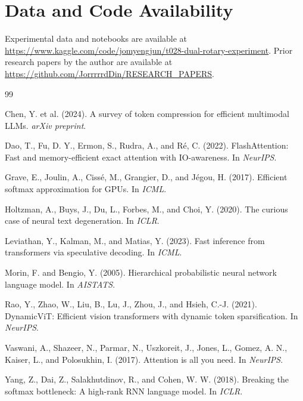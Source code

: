 \documentclass[11pt]{article}
\begin{document}
\section*{Data and Code Availability}

Experimental data and notebooks are available at \url{https://www.kaggle.com/code/jomyengjun/t028-dual-rotary-experiment}. Prior research papers by the author are available at \url{https://github.com/JorrrrrdDin/RESEARCH_PAPERS}.

\begin{thebibliography}{99}

Chen, Y. et al. (2024). A survey of token compression for efficient multimodal LLMs. \emph{arXiv preprint}.

Dao, T., Fu, D. Y., Ermon, S., Rudra, A., and R\'e, C. (2022). FlashAttention: Fast and memory-efficient exact attention with IO-awareness. In \emph{NeurIPS}.

Grave, E., Joulin, A., Ciss\'e, M., Grangier, D., and J\'egou, H. (2017). Efficient softmax approximation for GPUs. In \emph{ICML}.

Holtzman, A., Buys, J., Du, L., Forbes, M., and Choi, Y. (2020). The curious case of neural text degeneration. In \emph{ICLR}.

Leviathan, Y., Kalman, M., and Matias, Y. (2023). Fast inference from transformers via speculative decoding. In \emph{ICML}.

Morin, F. and Bengio, Y. (2005). Hierarchical probabilistic neural network language model. In \emph{AISTATS}.

Rao, Y., Zhao, W., Liu, B., Lu, J., Zhou, J., and Hsieh, C.-J. (2021). DynamicViT: Efficient vision transformers with dynamic token sparsification. In \emph{NeurIPS}.

Vaswani, A., Shazeer, N., Parmar, N., Uszkoreit, J., Jones, L., Gomez, A. N., Kaiser, L., and Polosukhin, I. (2017). Attention is all you need. In \emph{NeurIPS}.

Yang, Z., Dai, Z., Salakhutdinov, R., and Cohen, W. W. (2018). Breaking the softmax bottleneck: A high-rank RNN language model. In \emph{ICLR}.

\end{thebibliography}
\end{document}
